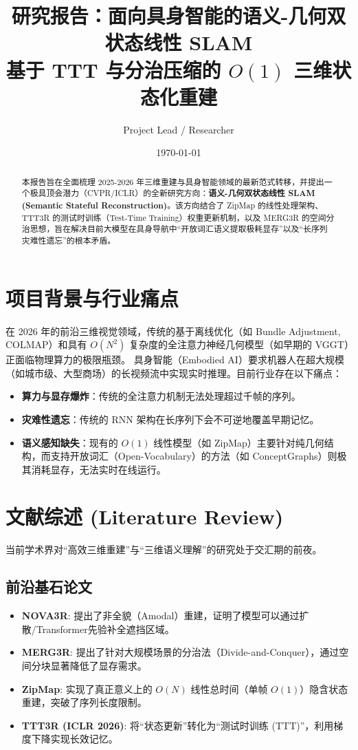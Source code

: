 \documentclass[12pt, a4paper]{article}
\title{\textbf{研究报告：面向具身智能的语义-几何双状态线性 SLAM}\\ \large 基于 TTT 与分治压缩的 $O(1)$ 三维状态化重建}
\author{Project Lead / Researcher}
\date{\today}
\begin{document}
\maketitle

\begin{abstract}
本报告旨在全面梳理 2025-2026 年三维重建与具身智能领域的最新范式转移，并提出一个极具顶会潜力（CVPR/ICLR）的全新研究方向：\textbf{语义-几何双状态线性 SLAM (Semantic Stateful Reconstruction)}。该方向结合了 ZipMap 的线性处理架构、TTT3R 的测试时训练（Test-Time Training）权重更新机制，以及 MERG3R 的空间分治思想，旨在解决目前大模型在具身导航中“开放词汇语义提取极耗显存”以及“长序列灾难性遗忘”的根本矛盾。
\end{abstract}

\tableofcontents
\newpage

\section{项目背景与行业痛点}
在 2026 年的前沿三维视觉领域，传统的基于离线优化（如 Bundle Adjustment, COLMAP）和具有 $O(N^2)$ 复杂度的全注意力神经几何模型（如早期的 VGGT）正面临物理算力的极限瓶颈。
具身智能（Embodied AI）要求机器人在超大规模（如城市级、大型商场）的长视频流中实现实时推理。目前行业存在以下痛点：
\begin{itemize}
    \item \textbf{算力与显存爆炸}：传统的全注意力机制无法处理超过千帧的序列。
    \item \textbf{灾难性遗忘}：传统的 RNN 架构在长序列下会不可逆地覆盖早期记忆。
    \item \textbf{语义感知缺失}：现有的 $O(1)$ 线性模型（如 ZipMap）主要针对纯几何结构，而支持开放词汇（Open-Vocabulary）的方法（如 ConceptGraphs）则极其消耗显存，无法实时在线运行。
\end{itemize}

\section{文献综述 (Literature Review)}
当前学术界对“高效三维重建”与“三维语义理解”的研究处于交汇期的前夜。
\subsection{前沿基石论文}
\begin{itemize}
    \item \textbf{NOVA3R}: 提出了非全貌（Amodal）重建，证明了模型可以通过扩散/Transformer先验补全遮挡区域。
    \item \textbf{MERG3R}: 提出了针对大规模场景的分治法（Divide-and-Conquer），通过空间分块显著降低了显存需求。
    \item \textbf{ZipMap}: 实现了真正意义上的 $O(N)$ 线性总时间（单帧 $O(1)$）隐含状态重建，突破了序列长度限制。
    \item \textbf{TTT3R (ICLR 2026)}: 将“状态更新”转化为“测试时训练 (TTT)”，利用梯度下降实现长效记忆。
\end{itemize}
\end{document}
